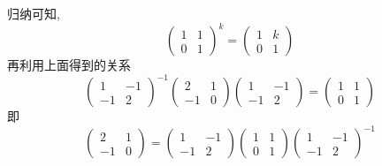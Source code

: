 \documentclass[13pt]{beamer}
\begin{document}
\begin{frame}
归纳可知, 
\[
\left(\begin{array}{ll}
1 & 1 \\
0 & 1
\end{array}\right)^{k}=\left(\begin{array}{ll}
1 & k \\
0 & 1
\end{array}\right)
\]
再利用上面得到的关系
\[
\left(\begin{array}{rr}
1 & -1 \\
-1 & 2
\end{array}\right)^{-1}\left(\begin{array}{rr}
2 & 1 \\
-1 & 0
\end{array}\right)\left(\begin{array}{rr}
1 & -1 \\
-1 & 2
\end{array}\right)=\left(\begin{array}{ll}
1 & 1 \\
0 & 1
\end{array}\right)
\]
即
\[
\left(\begin{array}{rr}
2 & 1 \\
-1 & 0
\end{array}\right)=\left(\begin{array}{rr}
1 & -1 \\
-1 & 2
\end{array}\right)\left(\begin{array}{rr}
1 & 1 \\
0 & 1
\end{array}\right)\left(\begin{array}{rr}
1 & -1 \\
-1 & 2
\end{array}\right)^{-1}
\]
\end{frame}
\end{document}
